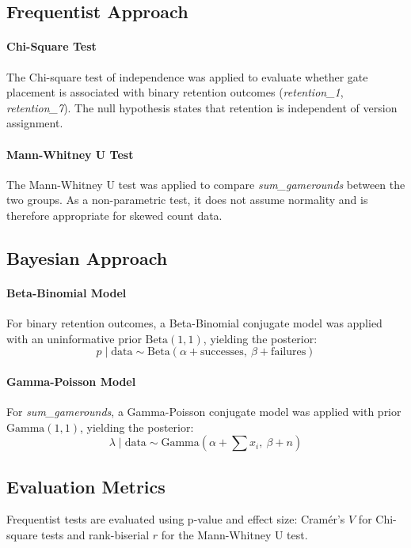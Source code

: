 \documentclass[12pt]{article}
\begin{document}
\subsection{Frequentist Approach}

\paragraph{Chi-Square Test}
The Chi-square test of independence was applied to evaluate whether gate placement 
is associated with binary retention outcomes (\textit{retention\_1}, \textit{retention\_7}). 
The null hypothesis states that retention is independent of version assignment.

\paragraph{Mann-Whitney U Test}
The Mann-Whitney U test was applied to compare \textit{sum\_gamerounds} between 
the two groups. As a non-parametric test, it does not assume normality and is 
therefore appropriate for skewed count data.

\subsection{Bayesian Approach}

\paragraph{Beta-Binomial Model}
For binary retention outcomes, a Beta-Binomial conjugate model was applied with 
an uninformative prior $\text{Beta}(1, 1)$, yielding the posterior:
\[
p \mid \text{data} \sim \text{Beta}(\alpha + \text{successes},\ \beta + \text{failures})
\]

\paragraph{Gamma-Poisson Model}
For \textit{sum\_gamerounds}, a Gamma-Poisson conjugate model was applied with 
prior $\text{Gamma}(1, 1)$, yielding the posterior:
\[
\lambda \mid \text{data} \sim \text{Gamma}\!\left(\alpha + \sum x_i,\ \beta + n\right)
\]

\subsection{Evaluation Metrics}

Frequentist tests are evaluated using p-value and effect size: Cramér's $V$ for 
Chi-square tests and rank-biserial $r$ for the Mann-Whitney U test.
\end{document}
